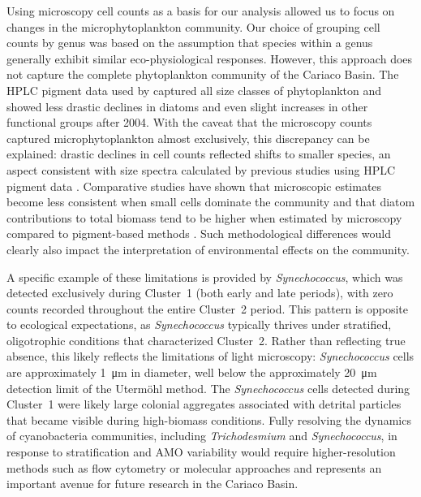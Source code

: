 \documentclass[]{agujournal2019}
\begin{document}
     Using microscopy cell counts as a basis for our analysis allowed us to focus on changes in the microphytoplankton community. Our choice of grouping cell counts by genus was based on the assumption that species within a genus generally exhibit similar eco-physiological responses. However, this approach does not capture the complete phytoplankton community of the Cariaco Basin. The HPLC pigment data used by \citeauthor{pinckney_phytoplankton_2015} captured all size classes of phytoplankton and showed less drastic declines in diatoms and even slight increases in other functional groups after 2004. With the caveat that the microscopy counts captured microphytoplankton almost exclusively, this discrepancy can be explained: drastic declines in cell counts reflected shifts to smaller species, an aspect consistent with size spectra calculated by previous studies using HPLC pigment data \cite{lorenzoni_characterization_2015}.  Comparative studies have shown that microscopic estimates become less consistent when small cells dominate the community and that diatom contributions to total biomass tend to be higher when estimated by microscopy compared to pigment-based methods \cite{schluter_use_2000, havskum_routine_2004}. Such methodological differences would clearly also impact the interpretation of environmental effects on the community.

    A specific example of these limitations is provided by \textit{Synechococcus}, which was detected exclusively during Cluster~1 (both early and late periods), with zero counts recorded throughout the entire Cluster~2 period. This pattern is opposite to ecological expectations, as \textit{Synechococcus} typically thrives under stratified, oligotrophic conditions that characterized Cluster~2. Rather than reflecting true absence, this likely reflects the limitations of light microscopy: \textit{Synechococcus} cells are approximately \qty{1}{\micro\meter} in diameter, well below the approximately \qty{20}{\micro\meter} detection limit of the Utermöhl method. The \textit{Synechococcus} cells detected during Cluster~1 were likely large colonial aggregates associated with detrital particles that became visible during high-biomass conditions. Fully resolving the dynamics of cyanobacteria communities, including \textit{Trichodesmium} and \textit{Synechococcus}, in response to stratification and AMO variability would require higher-resolution methods such as flow cytometry or molecular approaches and represents an important avenue for future research in the Cariaco Basin.
\end{document}
